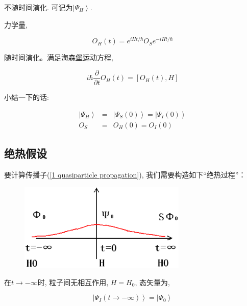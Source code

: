 不随时间演化. 可记为$\left| \Psi_H \right\rangle$.

力学量,

\begin{equation*}
O_H (t) = e^{i Ht / \hbar} O_S e^{-i Ht / \hbar}
\end{equation*}

随时间演化。满足海森堡运动方程,

\begin{equation*}
i \hbar \frac{\partial }{\partial t} O_H (t) = \left[ O_H (t), H
\right]
\end{equation*}

小结一下的话:

\begin{eqnarray*}
  \left| \Psi_H \right\rangle &=& \left| \Psi_S (0) \right\rangle =  \left| \Psi_I (0) \right\rangle\\
  O_S &=& O_H (0) = O_I (0)
\end{eqnarray*}

\subsection{绝热假设}

要计算传播子(\ref{1 quasiparticle propagation}),
我们需要构造如下“绝热过程”：

\begin{figure}[h]
\begin{center}
  \includegraphics[width=8cm]{Zero/juerejinsi.ps}\\
\end{center}
\end{figure}

在$t \to - \infty$时, 粒子间无相互作用, $H = H_0$, 态矢量为,

\begin{equation*}
\left| \Psi_I (t \to - \infty) \right\rangle = \left| \Phi_0
\right\rangle
\end{equation*}

